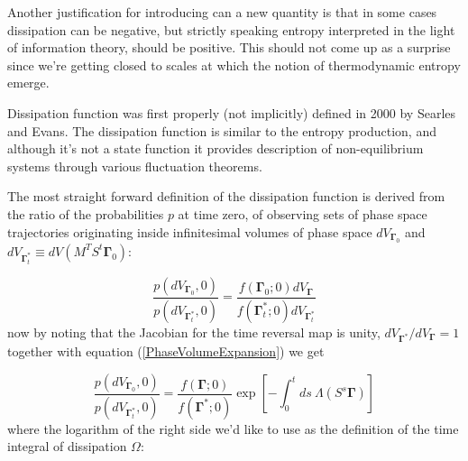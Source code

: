 \documentclass[a4paper,12pt]{article}
\begin{document}
Another justification for introducing can a new quantity is that in some cases dissipation can be negative, but strictly speaking entropy interpreted in the light of information theory, should be positive. This should not come up as a surprise since we're getting closed to scales at which the notion of thermodynamic entropy emerge. 

%

Dissipation function was first properly (not implicitly) defined in 2000 by Searles and Evans\cite{Searles:2000ig}.
The dissipation function is similar to the entropy production, and although it's not a state function it provides description of non-equilibrium systems through various fluctuation theorems.

The most straight forward definition of the dissipation function is derived from the ratio of the probabilities $p$ at time zero, of observing sets of phase space trajectories originating inside infinitesimal volumes of phase space $dV_{\bm{\Gamma}_0}$ and $dV_{\bm{\Gamma}_t^*}\equiv d V(M^T S^t \bm{\Gamma}_0)$:

\begin{equation}
\label{ReversibilityEvans}
  \frac{p(d V_{\bm{\Gamma}_0}, 0)}{p(d V_{\bm{\Gamma}_t^*},0)}= 
  \frac{f(\bm{\Gamma}_0;0)d V_{\bm{\Gamma}}}{f(\bm{\Gamma}_t^*;0)d V_{\bm{\Gamma}_t^*}}
\end{equation}
now by noting that the Jacobian for the time reversal map is unity, 
\newline $ d V_{\bm{\Gamma}^*}/ d V_{\bm{\Gamma}} =1 $ together with equation (\ref{PhaseVolumeExpansion}) we get


\begin{equation}
  \frac{p(d V_{\bm{\Gamma}_0}, 0)}{p(d V_{\bm{\Gamma}_t^*},0)}=
  \frac{f(\bm{\Gamma};0)}{f(\bm{\Gamma}^*;0)} 
  \exp[-\int_0^t ds \ \Lambda(S^s \bm{\Gamma})]
\end{equation}
where the logarithm of the right side we'd like to use as the definition of the time integral of dissipation $\Omega$:
\end{document}
